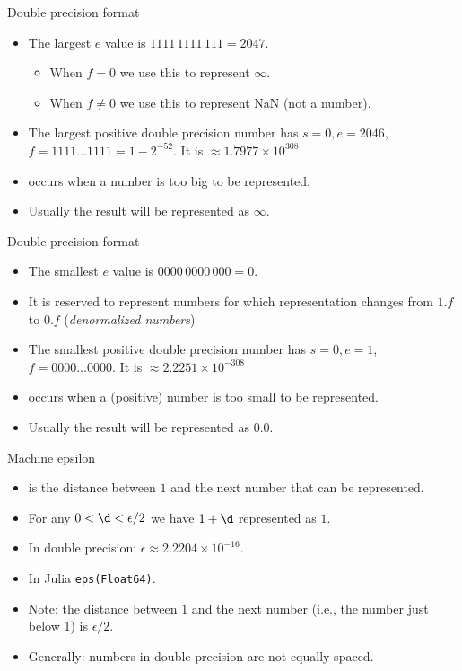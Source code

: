 \documentclass[11pt,xcolor={dvipsnames},aspectratio=159,hyperref={pdftex,pdfpagemode=UseNone,hidelinks,pdfdisplaydoctitle=true},usepdftitle=false]{beamer}
\begin{document}
\begin{frame}{Double precision format}
    \begin{itemize}
    
        \item The largest $e$ value is $1111\,1111\,111 = 2047$. 
        \begin{itemize}
            \item When $f = 0$ we use this to represent $\infty$. 
            \item When $f \neq 0$ we use this to represent NaN (not a number).
        \end{itemize}
        \item The largest positive double precision number
        has $s = 0, e = 2046$,  $f = 1111 \ldots 1111 = 1 - 2^{-52}$. It is $\approx 1.7977 × 10^{308}$ 
        \item {} occurs when a number is too big to be represented. 
        \item Usually the result will be represented as $\infty$.
    \end{itemize}
\end{frame}


\begin{frame}{Double precision format}
    \begin{itemize}
    
        \item The smallest $e$ value is $0000\,0000\,000 = 0$.
        \item It is reserved to represent numbers for which representation changes from $1.f$ to $0.f$ (\emph{denormalized numbers})
        \item The smallest positive double precision number
        has $s = 0, e = 1$,  $f = 0000 \ldots 0000$. It is $\approx 2.2251 × 10^{-308}$ 
        \item {} occurs when a (positive) number is too small to be represented.
        \item Usually the result will be represented as $0.0$.
    \end{itemize}
\end{frame}

\begin{frame}{Machine epsilon}
    \begin{itemize}
    
        \item {} is the distance between $1$ and the next  number that can be represented.
        \item For any $0<\d < \epsilon\slash 2$ we have $1 + \d$ represented as $1$.
        \item In double precision: $\epsilon \approx 2.2204 \times 10^{-16}$.
        \item In Julia \texttt{eps(Float64)}.
        \item Note: the distance between $1$ and the next  number (i.e., the number just below 1) is  $\epsilon \slash 2$.
        \item Generally: numbers in double precision are not equally spaced.
    \end{itemize}
\end{frame}
\end{document}
